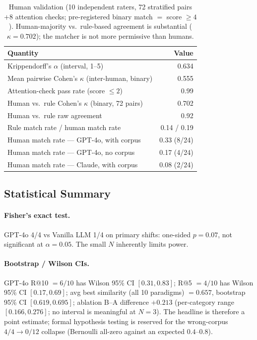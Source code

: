 \documentclass[11pt]{article}
\begin{document}
\begin{table}[t]
\centering
\caption{Human validation (10 independent raters, 72 stratified pairs $+8$ attention checks; pre-registered binary match $=$ score $\geq 4$). Human-majority vs.\ rule-based agreement is substantial ($\kappa = 0.702$); the matcher is not more permissive than humans.}
\label{tab:human_val}
\footnotesize
\setlength{\tabcolsep}{4pt}
\begin{tabular}{@{}>{\raggedright\arraybackslash}p{} r@{}}
\toprule
Quantity & Value \\
\midrule
Krippendorff's $\alpha$ (interval, 1--5)              & 0.634 \\
Mean pairwise Cohen's $\kappa$ (inter-human, binary)  & 0.555 \\
Attention-check pass rate (score $\leq 2$)            & 0.99 \\
\midrule
Human vs.\ rule Cohen's $\kappa$ (binary, 72 pairs) & 0.702 \\
Human vs.\ rule raw agreement                        & 0.92 \\
Rule match rate / human match rate                   & 0.14 / 0.19 \\
Human match rate --- GPT-4o, with corpus               & 0.33 (8/24) \\
Human match rate --- GPT-4o, no corpus                 & 0.17 (4/24) \\
Human match rate --- Claude, with corpus               & 0.08 (2/24) \\
\bottomrule
\end{tabular}
\end{table}

\subsection{Statistical Summary}\label{sec:stats}


\paragraph{Fisher's exact test.}
GPT-4o 4/4 vs Vanilla LLM 1/4 on primary shifts: one-sided $p = 0.07$, not significant at $\alpha = 0.05$. The small $N$ inherently limits power.

\paragraph{Bootstrap / Wilson CIs.}
GPT-4o R@10 $=6/10$ has Wilson 95\% CI $[0.31, 0.83]$; R@5 $=4/10$ has Wilson 95\% CI $[0.17, 0.69]$; avg best similarity (all 10 paradigms) $=0.657$, bootstrap 95\% CI $[0.619, 0.695]$; ablation B--A difference $+0.213$ (per-category range $[0.166, 0.276]$; no interval is meaningful at $N{=}3$). The headline is therefore a point estimate; formal hypothesis testing is reserved for the wrong-corpus $4/4{\rightarrow}0/12$ collapse (Bernoulli all-zero against an expected $0.4$--$0.8$).
\end{document}
